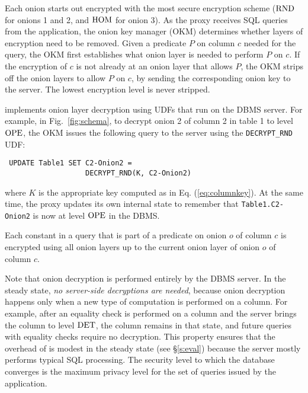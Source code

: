 Each onion starts out encrypted with the most secure encryption scheme
($\textrm{RND}$ for onions 1 and 2, and $\textrm{HOM}$ for onion 3)\@.  As the proxy
receives SQL queries from the application, the onion key manager (OKM)
determines whether layers of encryption need to be removed.  Given a
predicate $P$ on column $c$ needed for the query, the OKM first
establishes what onion layer is needed to perform $P$ on $c$.  If the
encryption of $c$ is not already at an onion layer that allows $P$,
the OKM strips off the onion layers to allow $P$ on $c$, by sending
the corresponding onion key to the server. The lowest encryption level is never stripped.

\name{} implements onion layer decryption using UDFs that run on the
DBMS server.  For example, in Fig.~\ref{fig:schema}, to decrypt onion 2 of
column 2 in table 1 to level $\textrm{OPE}$, the OKM issues the following query
to the server using the {\tt DECRYPT\_RND} UDF:

\begin{verbatim}
 UPDATE Table1 SET C2-Onion2 =
                   DECRYPT_RND(K, C2-Onion2)
\end{verbatim}
where $K$ is the appropriate key computed as in Eq.
(\ref{eq:columnkey}).  At the same time, the proxy updates its own
internal state to remember that \texttt{Table1.C2-Onion2} is now at
level $\textrm{OPE}$ in the DBMS\@.

Each constant in a query that is part of a predicate on onion $o$ of column $c$ is encrypted using all onion layers up to the current onion layer of onion $o$ of column $c$. 

Note that onion decryption is performed entirely by the DBMS server.
In the steady state, {\em no server-side decryptions are needed},
because onion decryption happens only when a new type of computation
is performed on a column.  For example, after an equality check is performed
on a column and the server brings the column to level $\textrm{DET}$, the
column remains in that state, and future queries with equality checks require no decryption.  This property ensures that the
overhead of \name{} is modest in the steady state (see \S\ref{s:eval}) because the server mostly performs typical SQL processing.
The security level to which the database converges is the maximum
privacy level for the set of queries issued by the application.

\newcommand\B{\rule[-2.0ex]{0pt}{0pt}}

